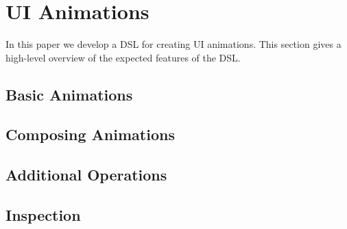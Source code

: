 \section{UI Animations}
\label{sec:ui_animations}

In this paper we develop a DSL for creating UI animations. This section gives a high-level overview of the expected features of the DSL.

\subsection{Basic Animations}

\subsection{Composing Animations}

\subsection{Additional Operations}

\subsection{Inspection}
